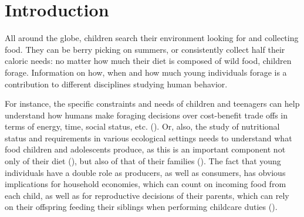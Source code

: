 \section{Introduction}
All around the globe, children search their environment looking for and collecting food. 
They can be berry picking on summers, or consistently collect half their caloric needs: no matter how much their diet is composed of wild food, children forage. 
Information on how, when and how much young individuals forage is a contribution to different disciplines studying human behavior.

For instance, the specific constraints and needs of children and teenagers can help understand how humans make foraging decisions over cost-benefit trade offs in terms of energy, time, social status, etc. (\cite{bliege_bird_children_1995, bird_ethnoarchaeology_2000, bird_children_2002}).
Or, also, the study of nutritional status and requirements in various ecological settings needs to understand what food children and adolescents produce, as this is an important component not only of their diet (\cite{pollom_changes_2020, pollom_effects_nodate, mcgarry_children_2009}),
but also of that of their families (\cite{fouts_who_2009}). 
The fact that young individuals have a double role as producers, as well as consumers, has obvious implications for household economies, which can count on incoming food from each child, as well as for reproductive decisions of their parents, which can rely on their offspring feeding their siblings when performing childcare duties (\cite{kramer_variation_2002, kramer_maya_2005, kramer_childrens_2005, kramer_does_2009, crittenden_juvenile_2013}). 

